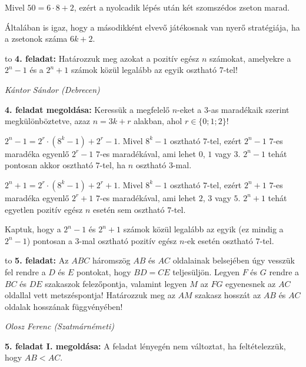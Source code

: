 \documentclass[a4paper,10pt]{article}
\def\ki#1#2{\hfill {\it #1 (#2)}\medskip}
\begin{document}
Mivel $50=6\cdot 8+2$, ezért a nyolcadik lépés után két szomszédos zseton marad.

Általában is igaz, hogy a másodikként elvevő játékosnak van nyerő stratégiája, ha a zsetonok
száma $6k+2$.

\medskip


\hbox to 
{\bf 4. feladat: } Határozzuk meg azokat a pozitív egész $n$ számokat, amelyekre a $2^n-1$ és a $2^n+1$ számok közül
legalább az egyik osztható 7-tel!


\ki{Kántor Sándor}{Debrecen}\medskip

{\bf 4. feladat megoldása: }
Keressük a megfelelő $n$-eket a $3$-as maradékaik szerint megkülönböztetve, azaz
$n=3k+r$ alakban, ahol $r\in\{0;1;2\}$!

$2^n-1=2^r\cdot\left(8^k-1\right)+2^r-1$. Mivel $8^k-1$ osztható $7$-tel, ezért $2^n-1$ $7$-es maradéka egyenlő
$2^r-1$ $7$-es maradékával, ami lehet $0$, $1$ vagy $3$. $2^n-1$ tehát pontosan akkor osztható $7$-tel, ha
$n$ osztható $3$-mal.

$2^n+1=2^r\cdot\left(8^k-1\right)+2^r+1$. Mivel $8^k-1$ osztható $7$-tel, ezért $2^n+1$ $7$-es maradéka egyenlő $2^r+1$ $7$-es maradékával, ami lehet $2$, $3$ vagy $5$. $2^n+1$ tehát egyetlen pozitív egész $n$ esetén sem osztható $7$-tel.

Kaptuk, hogy a $2^n-1$ és $2^n+1$ számok közül legalább az egyik (ez mindig a $2^n-1$)
pontosan a $3$-mal osztható pozitív egész $n$-ek esetén osztható $7$-tel.

\medskip


\hbox to 
{\bf 5. feladat: } Az $ABC$ háromszög $AB$ és $AC$ oldalainak belsejében úgy vesszük fel rendre a $D$ és $E$ pontokat,
hogy $BD=CE$ teljesüljön. Legyen $F$ és $G$ rendre a $BC$ és $DE$ szakaszok felezőpontja, valamint
legyen $M$ az $FG$ egyenesnek az $AC$ oldallal vett metszéspontja! Határozzuk meg az $AM$ szakasz
hosszát az $AB$ és $AC$ oldalak hosszának függvényében!

\ki{Olosz Ferenc}{Szatmárnémeti}\medskip

{\bf 5. feladat I. megoldása: }
A feladat lényegén nem változtat, ha feltételezzük, hogy $AB<AC$.
\end{document}
